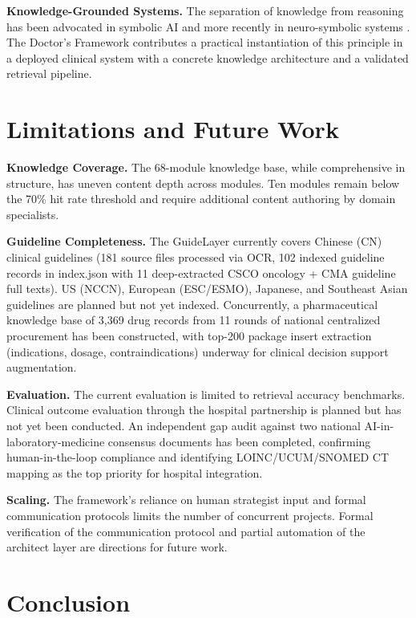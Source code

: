 \documentclass[11pt]{article}
\begin{document}
\textbf{Knowledge-Grounded Systems.} The separation of knowledge from 
reasoning has been advocated in symbolic AI \cite{lenat1990cyc} and 
more recently in neuro-symbolic systems \cite{garcez2020neurosymbolic}. 
The Doctor's Framework contributes a practical instantiation of this 
principle in a deployed clinical system with a concrete knowledge 
architecture and a validated retrieval pipeline.

\section{Limitations and Future Work}

\textbf{Knowledge Coverage.} The 68-module knowledge base, while 
comprehensive in structure, has uneven content depth across modules. 
Ten modules remain below the 70\% hit rate threshold and require 
additional content authoring by domain specialists.

\textbf{Guideline Completeness.} The GuideLayer currently covers Chinese
(CN) clinical guidelines (181 source files processed via OCR, 102
indexed guideline records in index.json with 11 deep-extracted CSCO
oncology + CMA guideline full texts). US (NCCN), European (ESC/ESMO),
Japanese, and Southeast Asian guidelines are planned but not yet indexed.
Concurrently, a pharmaceutical knowledge base of 3,369 drug records from
11 rounds of national centralized procurement has been constructed, with
top-200 package insert extraction (indications, dosage, contraindications)
underway for clinical decision support augmentation.

\textbf{Evaluation.} The current evaluation is limited to retrieval
accuracy benchmarks. Clinical outcome evaluation through the hospital
partnership is planned but has not yet been conducted. An independent
gap audit against two national AI-in-laboratory-medicine consensus
documents has been completed, confirming human-in-the-loop compliance
and identifying LOINC/UCUM/SNOMED CT mapping as the top priority for
hospital integration.

\textbf{Scaling.} The framework's reliance on human strategist input 
and formal communication protocols limits the number of concurrent 
projects. Formal verification of the communication protocol and 
partial automation of the architect layer are directions for future 
work.

\section{Conclusion}
\end{document}
